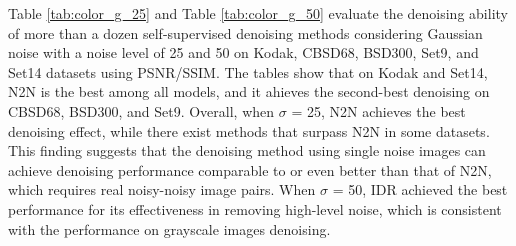 \documentclass[conference]{IEEEtran}
\begin{document}
Table \ref{tab:color_g_25} and Table \ref{tab:color_g_50} evaluate the denoising ability of more than a dozen self-supervised denoising methods considering Gaussian noise with a noise level of 25 and 50 on Kodak\cite{franzen1999kodak}, CBSD68\cite{roth2005fields}, BSD300\cite{roth2005fields}, Set9\cite{ulyanov2018deep}, and Set14\cite{zeyde2012single} datasets using PSNR/SSIM. The tables show that on Kodak and Set14, N2N is the best among all models, and it ahieves the second-best denoising on CBSD68, BSD300, and Set9. Overall, when $\sigma$ = 25, N2N\cite{lehtinen2018noise2noise} achieves the best denoising effect, while there exist methods that surpass N2N\cite{lehtinen2018noise2noise} in some datasets. This finding suggests that the denoising method using single noise images can achieve denoising performance comparable to or even better than that of N2N, which requires real noisy-noisy image pairs. When $\sigma$ = 50, IDR \cite{zhang2022idr} achieved the best performance for its effectiveness in removing high-level noise, which is consistent with the performance on grayscale images denoising.
\end{document}
